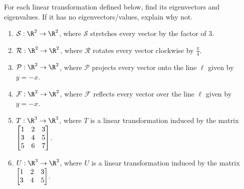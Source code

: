 \begin{exercises}
	\begin{problist}
		\prob For each linear transformation defined below, find its
		eigenvectors and eigenvalues. If it has no eigenvectors/values,
		explain why not.
		\begin{enumerate}
			\item $\mathcal S:\R^{2}\to\R^{2}$, where $\mathcal S$
				stretches every
				vector by the factor of $3$.

			\item $\mathcal R:\R^{2}\to\R^{2}$, where $\mathcal R$  
				rotates every vector
				clockwise by $\frac{\pi}{4}$.

			\item $\mathcal P:\R^{2}\to\R^{2}$, where $\mathcal P$
				projects every vector
				onto the line $\ell$ given by $y=-x$.

			\item $\mathcal F:\R^{2}\to\R^{2}$, where $\mathcal F$
				reflects every
				vector over the line $\ell$ given by $y=-x$.

			\item $T:\R^{3}\to\R^{3}$, where $T$ is a linear
				transformation induced by the matrix
				$\mat{1&2&3\\3&4&5\\5&6&7}$.

			\item $U:\R^{3}\to\R^{2}$, where $U$ is a linear
				transformation induced by the matrix
				$\mat{1&2&3\\3&4&5}$.
		\end{enumerate}
		

\end{problist}
\end{exercises}
